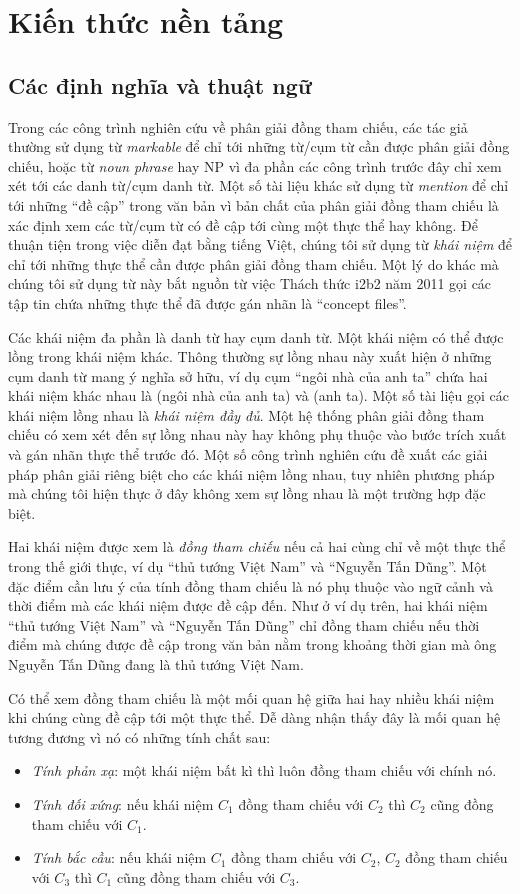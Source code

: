 \chapter{Kiến thức nền tảng}
\section{Các định nghĩa và thuật ngữ}
Trong các công trình nghiên cứu về phân giải đồng tham chiếu, các tác giả thường sử dụng từ \emph{markable} để chỉ tới những từ/cụm từ cần được phân giải đồng chiếu, hoặc từ \emph{noun phrase} hay NP vì đa phần các công trình trước đây chỉ xem xét tới các danh từ/cụm danh từ. Một số tài liệu khác sử dụng từ \emph{mention} để chỉ tới những ``đề cập'' trong văn bản vì bản chất của phân giải đồng tham chiếu là xác định xem các từ/cụm từ có đề cập tới cùng một thực thể hay không. Để thuận tiện trong việc diễn đạt bằng tiếng Việt, chúng tôi sử dụng từ \emph{khái niệm} để chỉ tới những thực thể cần được phân giải đồng tham chiếu. Một lý do khác mà chúng tôi sử dụng từ này bắt nguồn từ việc Thách thức i2b2 năm 2011 gọi các tập tin chứa những thực thể đã được gán nhãn là ``concept files''.

Các khái niệm đa phần là danh từ hay cụm danh từ. Một khái niệm có thể được lồng trong khái niệm khác. Thông thường sự lồng nhau này xuất hiện ở những cụm danh từ mang ý nghĩa sở hữu, ví dụ cụm ``ngôi nhà của anh ta'' chứa hai khái niệm khác nhau là (ngôi nhà của anh ta) và (anh ta). Một số tài liệu gọi các khái niệm lồng nhau là \emph{khái niệm đầy đủ}. Một hệ thống phân giải đồng tham chiếu có xem xét đến sự lồng nhau này hay không phụ thuộc vào bước trích xuất và gán nhãn thực thể trước đó. Một số công trình nghiên cứu đề xuất các giải pháp phân giải riêng biệt cho các khái niệm lồng nhau, tuy nhiên phương pháp mà chúng tôi hiện thực ở đây không xem sự lồng nhau là một trường hợp đặc biệt.

Hai khái niệm được xem là \emph{đồng tham chiếu} nếu cả hai cùng chỉ về một thực thể trong thế giới thực, ví dụ ``thủ tướng Việt Nam'' và ``Nguyễn Tấn Dũng''. Một đặc điểm cần lưu ý của tính đồng tham chiếu là nó phụ thuộc vào ngữ cảnh và thời điểm mà các khái niệm được đề cập đến. Như ở ví dụ trên, hai khái niệm ``thủ tướng Việt Nam'' và ``Nguyễn Tấn Dũng'' chỉ đồng tham chiếu nếu thời điểm mà chúng được đề cập trong văn bản nằm trong khoảng thời gian mà ông Nguyễn Tấn Dũng đang là thủ tướng Việt Nam.

Có thể xem đồng tham chiếu là một mối quan hệ giữa hai hay nhiều khái niệm khi chúng cùng đề cập tới một thực thể. Dễ dàng nhận thấy đây là mối quan hệ tương đương vì nó có những tính chất sau:
\begin{itemize}
\item \emph{Tính phản xạ}: một khái niệm bất kì thì luôn đồng tham chiếu với chính nó.
\item \emph{Tính đối xứng}: nếu khái niệm $C_1$ đồng tham chiếu với $C_2$ thì $C_2$ cũng đồng tham chiếu với $C_1$.
\item \emph{Tính bắc cầu}: nếu khái niệm $C_1$ đồng tham chiếu với $C_2$, $C_2$ đồng tham chiếu với $C_3$ thì $C_1$ cũng đồng tham chiếu với $C_3$.
\end{itemize}

